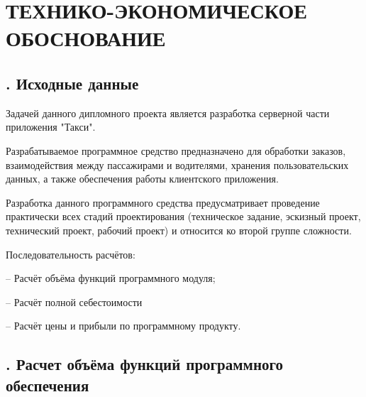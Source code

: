 \setcounter{chaptercntr}{5}

\sectionbreak \section*{
	\gostTitleFont
	\redline
	\thechaptercntr \space
	ТЕХНИКО-ЭКОНОМИЧЕСКОЕ ОБОСНОВАНИЕ
}

\titlespace

\subsection*{ 
	\gostTitleFont
	\redline
	\thechaptercntr .\thesubchaptercntr \spc
	Исходные данные
} \addtocounter{subchaptercntr}{1}

\subtitlespace

{\gostFont
	
	
	\par \redline Задачей данного дипломного проекта является разработка серверной части приложения "Такси"{}.
	\par \redline Разрабатываемое программное средство предназначено для обработки заказов, взаимодействия между пассажирами и водителями, хранения пользовательских данных, а также обеспечения работы клиентского приложения.
	\par \redline Разработка данного программного средства предусматривает проведение практически всех стадий проектирования (техническое задание, эскизный проект, технический проект, рабочий проект) и относится ко второй группе сложности.
	\par \redline Последовательность расчётов: 
	\par \redline – Расчёт объёма функций программного модуля;
	\par \redline – Расчёт полной себестоимости
	\par \redline – Расчёт цены и прибыли по программному продукту.
	
}

\subtitlespace

\subsection*{ 
	\gostTitleFont
	\redline
	\thechaptercntr .\thesubchaptercntr \spc
	Расчет объёма функций программного обеспечения
} \addtocounter{subchaptercntr}{1}

\subtitlespace

